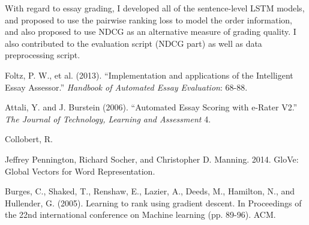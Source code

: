 \documentclass[10pt,psamsfonts]{amsart}
\theoremstyle{definition}
\theoremstyle{remark}
\numberwithin{equation}{section}
\begin{document}
With regard to essay grading, I developed all of the sentence-level LSTM models, and proposed to use the pairwise ranking loss to model the order information, and also proposed to use NDCG as an alternative measure of grading quality. I also contributed to the evaluation script (NDCG part) as well as data preprocessing script.

\begin{thebibliography}{99}
Foltz, P. W., et al. (2013). ``Implementation and applications of the Intelligent Essay Assessor.'' {\em Handbook of Automated Essay Evaluation}: 68-88.

Attali, Y. and J. Burstein (2006). ``Automated Essay Scoring with e-Rater V2.'' {\em The Journal of Technology, Learning and Assessment} 4.

Collobert, R.

Jeffrey Pennington, Richard Socher, and Christopher D. Manning. 2014. GloVe: Global Vectors for Word Representation.

Burges, C., Shaked, T., Renshaw, E., Lazier, A., Deeds, M., Hamilton, N., and Hullender, G. (2005). Learning to rank using gradient descent. In Proceedings of the 22nd international conference on Machine learning (pp. 89-96). ACM.


\end{thebibliography}
\end{document}
